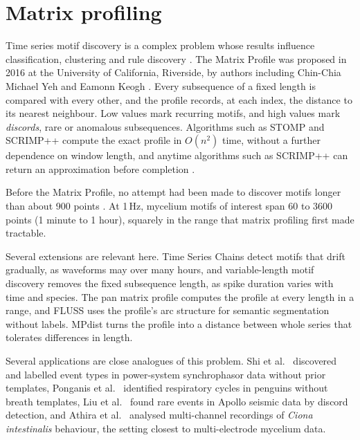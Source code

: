 \section{Matrix profiling}
\label{sec:litmp}
\label{sec:mp}

Time series motif discovery is a complex problem whose results influence classification, clustering and rule discovery \cite{linardi}. The Matrix Profile was proposed in 2016 at the University of California, Riverside, by authors including Chin-Chia Michael Yeh and Eamonn Keogh \cite{yeh}. Every subsequence of a fixed length is compared with every other, and the profile records, at each index, the distance to its nearest neighbour. Low values mark recurring motifs, and high values mark \emph{discords}, rare or anomalous subsequences. Algorithms such as STOMP and SCRIMP++ compute the exact profile in $O(n^2)$ time, without a further dependence on window length, and anytime algorithms such as SCRIMP++ can return an approximation before completion \cite{zhu2018scrimp}.

Before the Matrix Profile, no attempt had been made to discover motifs longer than about 900 points \cite{zhu2020}. At 1\,Hz, mycelium motifs of interest span 60 to 3600 points (1 minute to 1 hour), squarely in the range that matrix profiling first made tractable.

Several extensions are relevant here. Time Series Chains \cite{zhu2017} detect motifs that drift gradually, as waveforms may over many hours, and variable-length motif discovery \cite{linardi} removes the fixed subsequence length, as spike duration varies with time and species. The pan matrix profile \cite{madrid2019pan} computes the profile at every length in a range, and FLUSS \cite{gharghabi2017fluss} uses the profile's arc structure for semantic segmentation without labels. MPdist \cite{gharghabi2018mpdist} turns the profile into a distance between whole series that tolerates differences in length.

Several applications are close analogues of this problem. Shi et al.\ \cite{shi} discovered and labelled event types in power-system synchrophasor data without prior templates, Ponganis et al.\ \cite{ponganis} identified respiratory cycles in penguins without breath templates, Liu et al.\ \cite{liu} found rare events in Apollo seismic data by discord detection, and Athira et al.\ \cite{athira} analysed multi-channel recordings of \emph{Ciona intestinalis} behaviour, the setting closest to multi-electrode mycelium data.

